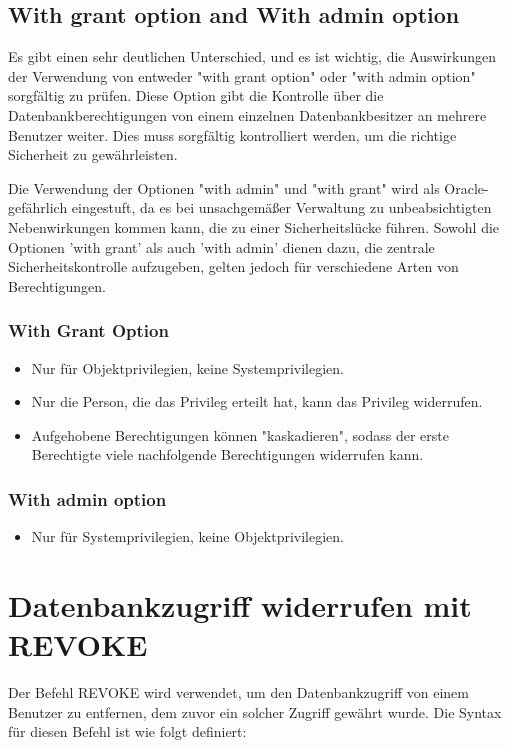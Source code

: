 \subsection{With grant option and With admin option}
Es gibt einen sehr deutlichen Unterschied, und es ist wichtig, die Auswirkungen der Verwendung von entweder "with grant option" oder "with admin option" sorgfältig zu prüfen. Diese Option gibt die Kontrolle über die Datenbankberechtigungen von einem einzelnen Datenbankbesitzer an mehrere Benutzer weiter. Dies muss sorgfältig kontrolliert werden, um die richtige Sicherheit zu gewährleisten.

Die Verwendung der Optionen "with admin" und "with grant" wird als Oracle-gefährlich eingestuft, da es bei unsachgemäßer Verwaltung zu unbeabsichtigten Nebenwirkungen kommen kann, die zu einer Sicherheitslücke führen. Sowohl die Optionen 'with grant' als auch 'with admin' dienen dazu, die zentrale Sicherheitskontrolle aufzugeben, gelten jedoch für verschiedene Arten von Berechtigungen.

\subsubsection{With Grant Option}
\begin{itemize}
    \item Nur für Objektprivilegien, keine Systemprivilegien.
    \item Nur die Person, die das Privileg erteilt hat, kann das Privileg widerrufen.
    \item Aufgehobene Berechtigungen können "kaskadieren", sodass der erste Berechtigte viele nachfolgende Berechtigungen widerrufen kann.
\end{itemize}

\subsubsection{With admin option}
\begin{itemize}
    \item Nur für Systemprivilegien, keine Objektprivilegien.
\end{itemize}

\section{Datenbankzugriff widerrufen mit REVOKE}
Der Befehl REVOKE wird verwendet, um den Datenbankzugriff von einem Benutzer zu entfernen, dem zuvor ein solcher Zugriff gewährt wurde. Die Syntax für diesen Befehl ist wie folgt definiert:

